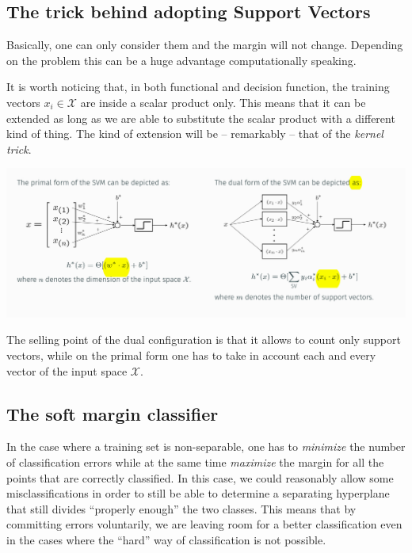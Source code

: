 \documentclass[10pt]{report}
\begin{document}
\subsection{The trick behind adopting Support Vectors}
\label{the-trick-behind-adopting-support-vectors}
Basically, one can only consider them and the margin will not change.
Depending on the problem this can be a huge advantage computationally
speaking.

It is worth noticing that, in both functional and decision function, the
training vectors \(x_ i \in \mathcal{X}\) are inside a scalar product
only. This means that it can be extended as long as we are able to
substitute the scalar product with a different kind of thing. The kind of
extension will be -- remarkably -- that of the \emph{kernel trick}.

\begin{center}
\includegraphics[scale=0.23]{./pics/svm/primal-dual-graph-comparison.jpg}
\end{center}

The selling point of the dual configuration is that it allows to count
only support vectors, while on the primal form one has to take in
account each and every vector of the input space \(\mathcal{X}\).

\subsection{The soft margin classifier}
\label{the-soft-margin-classifier}
In the case where a training set is non-separable, one has to \emph{minimize}
the number of classification errors while at the same time \emph{maximize} the
margin for all the points that are correctly classified. In this case,
we could reasonably allow some misclassifications in order to still be able to
determine a separating hyperplane that still divides ``properly enough''
the two classes. This means that by committing errors voluntarily, we are
leaving room for a better classification even in the cases where the ``hard''
way of classification is not possible.
\end{document}
